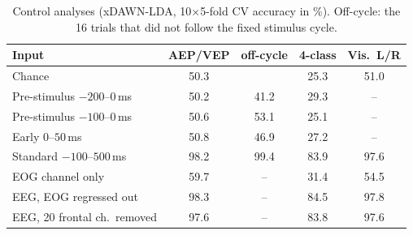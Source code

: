 \begin{table}[t]
\centering
\caption{Control analyses (xDAWN-LDA, 10$\times$5-fold CV accuracy in \%). Off-cycle: the 16 trials that did not follow the fixed stimulus cycle.}
\label{tab:ctl}
\setlength{\tabcolsep}{3pt}
\footnotesize
\begin{tabular}{lcccc}
\toprule
Input & AEP/VEP & off-cycle & 4-class & Vis.\ L/R \\
\midrule
Chance & 50.3 & & 25.3 & 51.0 \\
\midrule
Pre-stimulus $-200$--$0$\,ms & 50.2 & 41.2 & 29.3 & -- \\
Pre-stimulus $-100$--$0$\,ms & 50.6 & 53.1 & 25.1 & -- \\
Early $0$--$50$\,ms & 50.8 & 46.9 & 27.2 & -- \\
Standard $-100$--$500$\,ms & 98.2 & 99.4 & 83.9 & 97.6 \\
EOG channel only & 59.7 & -- & 31.4 & 54.5 \\
EEG, EOG regressed out & 98.3 & -- & 84.5 & 97.8 \\
EEG, 20 frontal ch.\ removed & 97.6 & -- & 83.8 & 97.6 \\
\bottomrule
\end{tabular}
\end{table}
